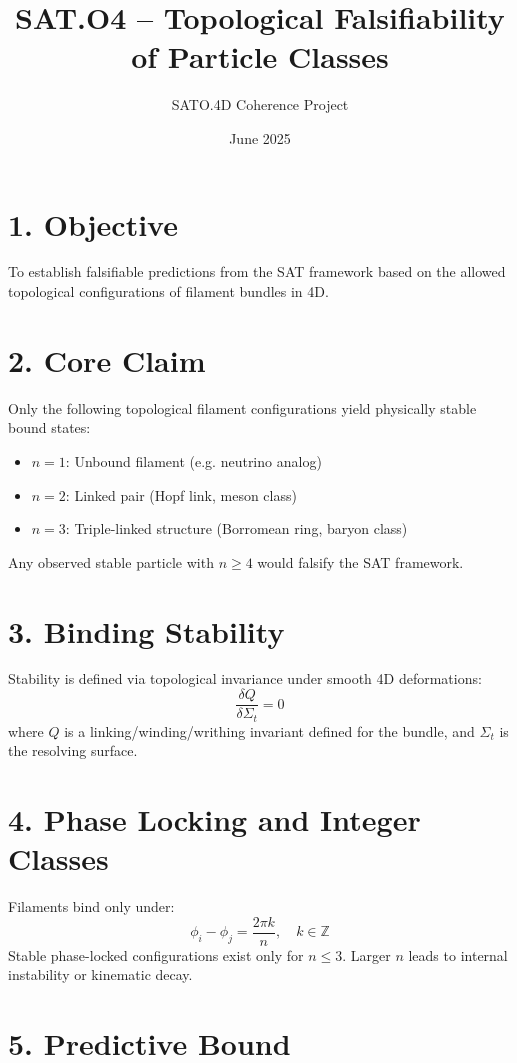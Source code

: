 \documentclass[12pt]{article}
\title{SAT.O4 – Topological Falsifiability of Particle Classes}
\author{SATO.4D Coherence Project}
\date{June 2025}
\begin{document}
\maketitle

\section*{1. Objective}

To establish falsifiable predictions from the SAT framework based on the allowed topological configurations of filament bundles in 4D.

\section*{2. Core Claim}

Only the following topological filament configurations yield physically stable bound states:
\begin{itemize}
    \item \( n = 1 \): Unbound filament (e.g. neutrino analog)
    \item \( n = 2 \): Linked pair (Hopf link, meson class)
    \item \( n = 3 \): Triple-linked structure (Borromean ring, baryon class)
\end{itemize}

Any observed stable particle with \( n \geq 4 \) would falsify the SAT framework.

\section*{3. Binding Stability}

Stability is defined via topological invariance under smooth 4D deformations:
\[
\frac{\delta Q}{\delta \Sigma_t} = 0
\]
where \( Q \) is a linking/winding/writhing invariant defined for the bundle, and \( \Sigma_t \) is the resolving surface.

\section*{4. Phase Locking and Integer Classes}

Filaments bind only under:
\[
\phi_i - \phi_j = \frac{2\pi k}{n}, \quad k \in \mathbb{Z}
\]
Stable phase-locked configurations exist only for \( n \leq 3 \). Larger \( n \) leads to internal instability or kinematic decay.

\section*{5. Predictive Bound}
\end{document}
